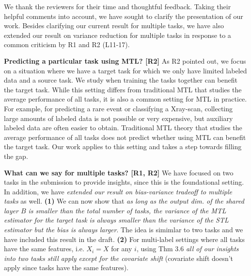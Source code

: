 \documentclass{article}
\begin{document}
We thank the reviewers for their time and thoughtful feedback.
Taking their helpful comments into account, we have sought to clarify the presentation of our work. %
Besides clarifying our current result for multiple tasks, we have also extended our result on variance reduction for multiple tasks in response to a common criticism by R1 and R2 (L11-17).


\vspace{-0.02in}
\textbf{Predicting a particular task using MTL? [R2]}
As R2 pointed out, we focus on a situation where we have a target task for which we only have limited labeled data and a source task.
We study when training the tasks together can benefit the target task.
While this setting differs from traditional MTL that studies the average performance of all tasks, it is also a common setting for MTL in practice.
For example, for predicting a rare event or classifying a Xray-scan, collecting large amounts of labeled data is not possible or very expensive, but auxiliary labeled data are often easier to obtain.
Traditional MTL theory that studies the average performance of all tasks does not predict whether using MTL can benefit the target task.
Our work applies to this setting and takes a step towards filling the gap.


\vspace{-0.025in}
\textbf{What can we say for multiple tasks? [R1, R2]}
We have focused on two tasks in the submission to provide insights, since this is the foundational setting.
In addition, we have \textit{extended our result on bias-variance tradeoff to multiple tasks} as well.
\textbf{(1)} We can now show that \textit{as long as the output dim. of the shared layer $B$ is smaller than the total number of tasks, the variance of the MTL estimator for the target task is always smaller than the variance of the STL estimator but the bias is always larger}.
The idea is simimlar to two tasks and we have included this result in the draft.
\textbf{(2)} For multi-label settings where all tasks have the same features, i.e. $X_i = X$ for any $i$, using Thm 3.6 \textit{all of our insights into two tasks still apply except for the covariate shift} (covariate shift doesn't apply since tasks have the same features).
\end{document}
